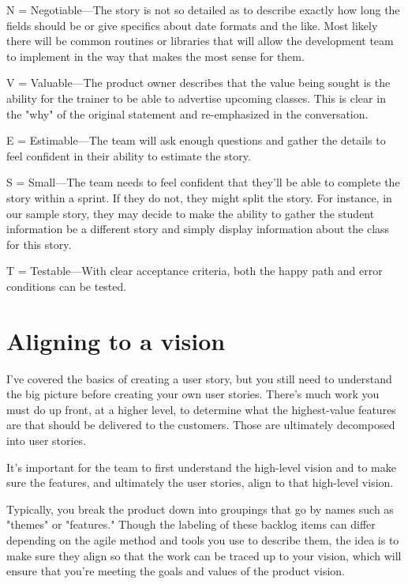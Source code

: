 N = Negotiable—The story is not so detailed as to describe exactly how long the fields should be or give specifics about date formats and the like. Most likely there will be common routines or libraries that will allow the development team to implement in the way that makes the most sense for them.

V = Valuable—The product owner describes that the value being sought is the ability for the trainer to be able to advertise upcoming classes. This is clear in the "why" of the original statement and re-emphasized in the conversation.

E = Estimable—The team will ask enough questions and gather the details to feel confident in their ability to estimate the story.

S = Small—The team needs to feel confident that they’ll be able to complete the story within a sprint. If they do not, they might split the story. For instance, in our sample story, they may decide to make the ability to gather the student information be a different story and simply display information about the class for this story.

T = Testable—With clear acceptance criteria, both the happy path and error conditions can be tested.

\section{Aligning to a vision}
I've covered the basics of creating a user story, but you still need to understand the big picture before creating your own user stories. There's much work you must do up front, at a higher level, to determine what the highest-value features are that should be delivered to the customers. Those are ultimately decomposed into user stories.

It's important for the team to first understand the high-level vision and to make sure the features, and ultimately the user stories, align to that high-level vision.

Typically, you break the product down into groupings that go by names such as "themes" or "features." Though the labeling of these backlog items can differ depending on the agile method and tools you use to describe them, the idea is to make sure they align so that the work can be traced up to your vision, which will ensure that you're meeting the goals and values of the product vision.


